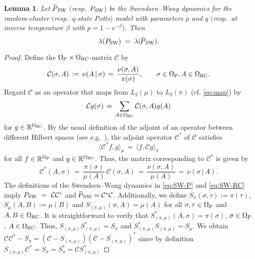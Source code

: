 \documentclass{dis}
\newtheorem{lemma}[theorem]{Lemma}
\theoremstyle{citing}
\begin{document}
\begin{lemma} \label{lemma:SW_P-RC}
Let ${{\raisebox{2pt}{ ${\widetilde{{}}}$ }\mkern-14mu P}_{\rm SW}}$ $($resp.~${P_{\rm SW}}$$)$ be the Swendsen--Wang dynamics 
for the random-cluster $($resp.~$q$-state Potts$)$ model with parameters 
$p$ and $q$ $($resp.~at inverse temperature $\beta$ with $p=1-e^{-\beta}$$)$. 
Then  
\[
\lambda({P_{\rm SW}}) \;=\; \lambda({{\raisebox{2pt}{ ${\widetilde{{}}}$ }\mkern-14mu P}_{\rm SW}}).
\]
\end{lemma}

\begin{proof}
Define the ${{\Omega}_{\rm P}}\times{{\Omega}_{\rm RC}}$-matrix ${\mathcal{C}}$ by
\[
{\mathcal{C}}(\sigma,A) \,:=\, \nu(A \,|\, \sigma)
\,=\, \frac{\nu(\sigma, A)}{\pi(\sigma)} , \qquad \sigma\in{{\Omega}_{\rm P}}, A\in{{\Omega}_{\rm RC}}.
\]
Regard ${\mathcal{C}}$ as an operator that maps from $L_2(\mu)$ to $L_2(\pi)$  
(cf. \eqref{eq:map}) by
\[
{\mathcal{C}} g(\sigma) \,=\, \sum_{A\in{{\Omega}_{\rm RC}}} {\mathcal{C}}(\sigma,A) g(A)
\]
for $g\in{\ensuremath{\mathbb{R}}}^{{\Omega}_{\rm RC}}$. 
By the usual definition of the adjoint of an operator between different 
Hilbert spaces (see e.g.~\cite[Def.~3.9-1]{Krey}), the adjoint operator 
${\mathcal{C}}^*$ of ${\mathcal{C}}$ satisfies
\[
{\langle}{\mathcal{C}}^* f, g{\rangle}_\mu \,=\, {\langle} f, {\mathcal{C}} g{\rangle}_\pi
\]
for all $f\in{\ensuremath{\mathbb{R}}}^{{\Omega}_{\rm P}}$ and $g\in{\ensuremath{\mathbb{R}}}^{{\Omega}_{\rm RC}}$. Thus, the matrix 
corresponding to ${\mathcal{C}}^*$ is given by 
\[
{\mathcal{C}}^*(A,\sigma) \,=\, \frac{\pi(\sigma)}{\mu(A)}\, {\mathcal{C}}(\sigma,A)
\,=\, \frac{\nu(\sigma, A)}{\mu(A)} 
\,=\, \nu(\sigma \,|\, A).
\]
The definitions of the Swendsen--Wang dynamics in \eqref{eq:SW-P} and 
\eqref{eq:SW-RC} imply ${P_{\rm SW}}~=~{\mathcal{C}} {\mathcal{C}}^*$ and ${{\raisebox{2pt}{ ${\widetilde{{}}}$ }\mkern-14mu P}_{\rm SW}}={\mathcal{C}}^* {\mathcal{C}}$. 
Additionally, we define $S_\pi(\sigma,\tau):=\pi(\tau)$, 
$S_\mu(A,B):=\mu(B)$ and 
$S_{(\pi,\mu)}(\sigma,A)=\mu(A)$ for all 
$\sigma,\tau\in{{\Omega}_{\rm P}}$ and $A,B\in{\Omega}_{\rm RC}$. 
It is straightforward to verify that 
$S^*_{(\pi,\mu)}(A,\sigma)=\pi(\sigma)$, 
$\sigma\in{{\Omega}_{\rm P}}$, $A\in{\Omega}_{\rm RC}$. Thus,  
$S_{(\pi,\mu)} S^*_{(\pi,\mu)} = S_{\pi}$ and 
$S^*_{(\pi,\mu)} S_{(\pi,\mu)} = S_{\mu}$.
We obtain ${\mathcal{C}} {\mathcal{C}}^*-S_{\pi}=({\mathcal{C}}-S_{(\pi,\mu)})({\mathcal{C}}-S_{(\pi,\mu)})^*$
since by definition 
$S_{(\pi,\mu)} {\mathcal{C}}^*=S_\pi=S_\pi^*={\mathcal{C}} S^*_{(\pi,\mu)}$  

\end{proof}
\end{document}
